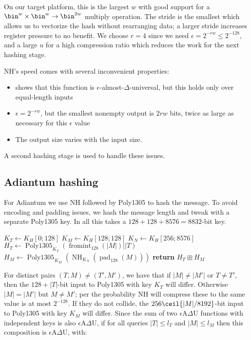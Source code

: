 \documentclass[journal=tosc,preprint,floatrow,submission]{iacrtrans}
\DeclareMathOperator{\Polydjb}{Poly1305}
\DeclareMathOperator{\NH}{NH}
\DeclareMathOperator{\fromint}{fromint}
\DeclareMathOperator{\pad}{pad}
\begin{document}
On our target platform, this
is the largest $w$ with good support for a $\bin^w \times \bin^w \rightarrow \bin^{2w}$
multiply operation. The stride is the smallest which allows us to vectorize the hash
without rearranging data; a larger stride increases register pressure to no benefit. We choose
$r=4$ since we need $\epsilon = 2^{-rw} \leq 2^{-128}$, and a large $u$ for a high compression ratio
which reduces the work for the next hashing stage.

NH's speed comes with several inconvenient properties:
\begin{itemize}
    \item \cite{nh} shows that this function is $\epsilon$-almost-$\Delta$-universal, but this
        holds only over equal-length inputs
    \item $\epsilon = 2^{-rw}$, but the smallest nonempty output is $2rw$ bits, twice as large
        as necessary for this $\epsilon$ value
    \item The output size varies with the input size.
\end{itemize}
A second hashing stage is used to handle these issues.

\subsection{Adiantum hashing}

For Adiantum we use NH followed by Poly1305 to hash the message.
To avoid encoding and padding issues, we hash the message length and tweak with
a separate Poly1305 key.
In all this takes a $128 + 128 + 8576 = 8832$-bit key.

\begin{algorithmic}[0]
    \State $K_T \gets K_H[0;128]$
    \State $K_M \gets K_H[128;128]$
    \State $K_N \gets K_H[256;8576]$
    \State $H_T \gets \Polydjb_{K_T}(\fromint_{128}(|M|) || T)$
    \State $H_M \gets \Polydjb_{K_M}(\NH_{K_N}(\pad_{128}(M)))$
    \State \textbf{return} $H_T \boxplus H_M$
    \EndProcedure
\end{algorithmic}

For distinct pairs $(T,M) \neq (T', M')$, we have that if $|M| \neq |M'|$ or $T \neq T'$,
then the $128 + |T|$-bit input to Poly1305 with key $K_T$ will differ.
Otherwise $|M| = |M'|$ but $M \neq M'$;
per \cite{nh} the probability NH will compress these to the same value is at most
$2^{-128}$. If they do not collide, the $256\ceil{|M|/8192}$-bit input to Poly1305 with key $K_M$
will differ. Since the sum of two $\epsilon$A$\Delta$U functions with independent keys is also
$\epsilon$A$\Delta$U, if for all queries $|T| \leq l_T$ and $|M| \leq l_M$ then
this composition is  $\epsilon$A$\Delta$U, with:
\end{document}
